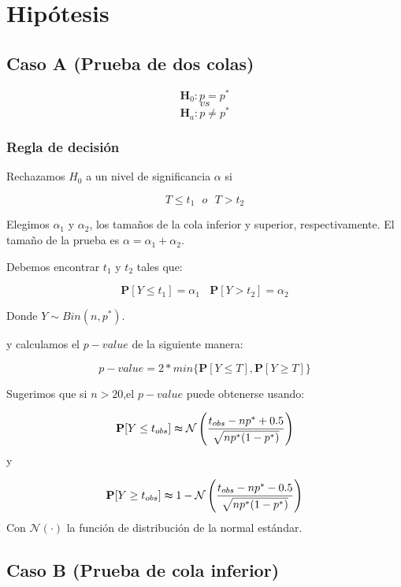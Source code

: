 \documentclass[
  a4paper,
  oneside,
  openany]{book}
\begin{document}
\hypertarget{hipuxf3tesis}{%
\section{Hipótesis}\label{hipuxf3tesis}}

\hypertarget{caso-a-prueba-de-dos-colas}{%
\subsection*{Caso A (Prueba de dos colas)}\label{caso-a-prueba-de-dos-colas}}


\[\textbf{H}_0: p = p^*\]
\[vs\]
\[\textbf{H}_a: p \neq p^*\]

\hypertarget{regla-de-decisiuxf3n}{%
\subsubsection*{Regla de decisión}\label{regla-de-decisiuxf3n}}


Rechazamos \(H_0\) a un nivel de significancia \(\alpha\) si

\[T \leq t_{1} \ \ \ o \ \ \ T > t_{2}\]

Elegimos \(\alpha_{1}\) y \(\alpha_{2}\), los tamaños de la cola inferior y superior, respectivamente. El tamaño de la prueba es \(\alpha=\alpha_{1}+\alpha_{2}\).

Debemos encontrar \(t_{1}\) y \(t_{2}\) tales que:

\[\mathbf{P}[Y \leq t_{1}]=\alpha_{1} \ \ \ \ \mathbf{P}[Y > t_{2}]=\alpha_{2}\]

Donde \(Y \sim Bin (n,p^*)\).

y calculamos el \(p-value\) de la siguiente manera:

\[p-value=2*min \{ \mathbf{P}[Y\leq T],\mathbf{P}[Y \geq T] \}\]

Sugerimos que si \(n > 20\),el \(p-value\) puede obtenerse usando:

\[\mathbf{P}[Y\leq t_{obs}] \thickapprox \mathcal{N} \left(\frac{t_{obs}-np^*+0.5}{\sqrt{np^*(1-p^*)}}\right)\]
y

\[\mathbf{P}[Y\geq t_{obs}] \thickapprox 1-\mathcal{N} \left(\frac{t_{obs}-np^*-0.5}{\sqrt{np^*(1-p^*)}}\right)\]
Con \(\mathcal{N}(\cdot)\) la función de distribución de la normal estándar.

\hypertarget{caso-b-prueba-de-cola-inferior}{%
\subsection*{Caso B (Prueba de cola inferior)}\label{caso-b-prueba-de-cola-inferior}}
\end{document}
